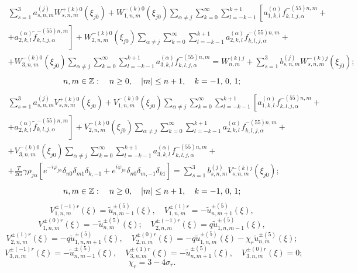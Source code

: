 \begin{multline}
\sum\limits_{s = 1}^3 {a_{s,n,m}^{(j)}} W_{s,n,m}^{ + (k)0}({\xi _{j0}}) + W_{1,n,m}^{ - (k)0}({\xi _{j0}})\sum\limits_{\alpha  \ne j} {\sum\limits_{k = 0}^\infty  {\sum\limits_{l =  - k - 1}^{k + 1} {\left[ {a_{1,k,l}^{(\alpha )}f_{k,l,j,\alpha }^{ - (55)n,m} + } \right.} } } \\
\left. { + a_{2,k,l}^{(\alpha )}\tilde f_{k,l,j,\alpha }^{ - (55)n,m}} \right] + W_{2,n,m}^{ - (k)0}({\xi _{j0}})\sum\limits_{\alpha  \ne j} {\sum\limits_{k = 0}^\infty  {\sum\limits_{l =  - k - 1}^{k + 1} {a_{2,k,l}^{(\alpha )}} } f_{k,l,j,\alpha }^{ - (55)n,m} + } \\
+ W_{3,n,m}^{ - (k)0}({\xi _{j0}})\sum\limits_{\alpha  \ne j} {\sum\limits_{k = 0}^\infty  {\sum\limits_{l =  - k - 1}^{k + 1} {a_{3,k,l}^{(\alpha )}} } f_{k,l,j,\alpha }^{ - (55)n,m}}  = W_{n,m}^{(k)j} + \sum\limits_{s = 1}^3 {b_{s,n,m}^{(j)}} W_{s,n,m}^{ - (k)j}({\xi _{j0}});
\end{multline}
$$
n,m \in\mathbb{Z}:\quad n \ge 0,\quad |m| \le n + 1,\quad k =  - 1,{\mkern 1mu} {\kern 1pt} 0,{\mkern 1mu} {\kern 1pt} 1;
$$
\begin{multline}
\sum\limits_{s = 1}^3 {a_{s,n,m}^{(j)}} V_{s,n,m}^{ + (k)0}({\xi _{j0}}) + V_{1,n,m}^{ - (k)0}({\xi _{j0}})\sum\limits_{\alpha  \ne j} {\sum\limits_{k = 0}^\infty  {\sum\limits_{l =  - k - 1}^{k + 1} {\left[ {a_{1,k,l}^{(\alpha )}f_{k,l,j,\alpha }^{ - (55)n,m} + } \right.} } } \\
\left. { + a_{2,k,l}^{(\alpha )}\tilde f_{k,l,j,\alpha }^{ - (55)n,m}} \right] + V_{2,n,m}^{ - (k)0}({\xi _{j0}})\sum\limits_{\alpha  \ne j} {\sum\limits_{k = 0}^\infty  {\sum\limits_{l =  - k - 1}^{k + 1} {a_{2,k,l}^{(\alpha )}} } f_{k,l,j,\alpha }^{ - (55)n,m} + } \\
+ V_{3,n,m}^{ - (k)0}({\xi _{j0}})\sum\limits_{\alpha  \ne j} {\sum\limits_{k = 0}^\infty  {\sum\limits_{l =  - k - 1}^{k + 1} {a_{3,k,l}^{(\alpha )}} } f_{k,l,j,\alpha }^{ - (55)n,m} + } \\
+ \frac{T}{{2G}}\gamma {\rho _{j\alpha }}\left[ {{e^{ - i{\varphi _{j\alpha }}}}{\delta _{n0}}{\delta _{m1}}{\delta _{k, - 1}} + {e^{i{\varphi _{j\alpha }}}}{\delta _{n0}}{\delta _{m, - 1}}{\delta _{k1}}} \right] = \sum\limits_{s = 1}^3 {b_{s,n,m}^{(j)}} V_{s,n,m}^{ - (k)j}({\xi _{j0}});
\end{multline}
$$
n,m \in\mathbb{Z}:\quad n \ge 0,\quad |m| \le n + 1,\quad k =  - 1,{\mkern 1mu} {\kern 1pt} 0,{\mkern 1mu} {\kern 1pt} 1;
$$
$$
V_{1,n,m}^{ \pm ( - 1)r}(\xi ) = \tilde u_{n,m - 1}^{ \pm (5)}(\xi ),\quad V_{1,n,m}^{ \pm (1)r} =  - \tilde u_{n,m + 1}^{ \pm (5)}(\xi ),
$$
$$
V_{1,n,m}^{ \pm (0)r}(\xi ) =  - \tilde u_{n,m}^{ \pm (5)}(\xi );\quad V_{2,n,m}^{ \pm ( - 1)r}(\xi ) = q\tilde u_{1,n,m - 1}^{ \pm (5)}(\xi ),
$$
$$
V_{2,n,m}^{ \pm (1)r}(\xi ) =  - q\tilde u_{1,n,m + 1}^{ \pm (5)}(\xi ),\quad V_{2,n,m}^{ \pm (0)r}(\xi ) =  - q\tilde u_{1,n,m}^{ \pm (5)}(\xi ) - {\chi _r}\tilde u_{n,m}^{ \pm (5)}(\xi );
$$
$$
V_{3,n,m}^{ \pm ( - 1)r}(\xi ) =  - \tilde u_{n,m - 1}^{ \pm (5)}(\xi ),\quad V_{3,n,m}^{ \pm (1)r}(\xi ) =  - \tilde u_{n,m + 1}^{ \pm (5)}(\xi ),\quad V_{3,n,m}^{ \pm (0)r}(\xi ) = 0;
$$
$$
{\chi _r} = 3 - 4{\sigma _r}.
$$

